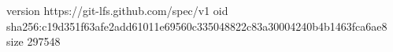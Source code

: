 version https://git-lfs.github.com/spec/v1
oid sha256:c19d351f63afe2add61011e69560c335048822c83a30004240b4b1463fca6ae8
size 297548
